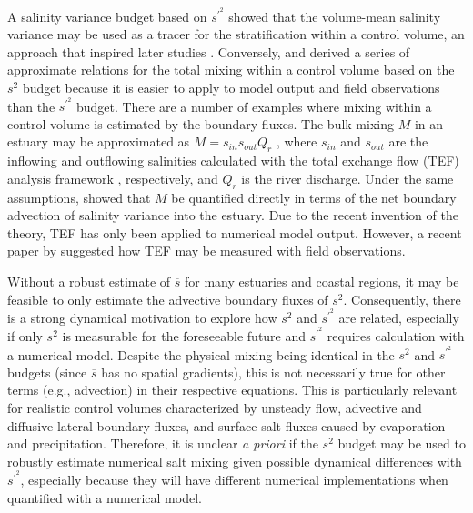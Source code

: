 \documentclass[draft]{agujournal2019}
\begin{document}
A salinity variance budget based on $s^{\prime^2}$ \cite{Li_2018} showed that the volume-mean salinity variance may be used as a tracer for the stratification within a control volume, an approach that inspired later studies \cite{Broatch_2022, Li_2021, Wang_2018}. Conversely,  and  derived a series of approximate relations for the total mixing within a control volume based on the $s^2$ budget because it is easier to apply to model output and field observations than the $s^{\prime^2}$ budget. There are a number of examples where mixing within a control volume is estimated by the boundary fluxes. The bulk mixing $M$ in an estuary may be approximated as $M=s_{in}s_{out}Q_r$ \cite{Burchard_2019, Burchard_2020}, where $s_{in}$ and $s_{out}$ are the inflowing and outflowing salinities calculated with the total exchange flow (TEF) analysis framework \cite{MacCready_2011}, respectively, and $Q_r$ is the river discharge. Under the same assumptions,  showed that $M$ be quantified directly in terms of the net boundary advection of salinity variance into the estuary. Due to the recent invention of the theory, TEF has only been applied to numerical model output. However, a recent paper by  suggested how TEF may be measured with field observations. 

Without a robust estimate of $\overline{s}$ for many estuaries and coastal regions, it may be feasible to only estimate the advective boundary fluxes of $s^2$. Consequently, there is a strong dynamical motivation to explore how $s^2$ and $s^{\prime^2}$ are related, especially if only $s^2$ is measurable for the foreseeable future and $s^{\prime^2}$ requires calculation with a numerical model. Despite the physical mixing being identical in the $s^2$ and $s^{\prime^2}$ budgets (since $\overline{s}$ has no spatial gradients), this is not necessarily true for other terms (e.g., advection) in their respective equations. This is particularly relevant for realistic control volumes characterized by unsteady flow, advective and diffusive lateral boundary fluxes, and surface salt fluxes caused by evaporation and precipitation. Therefore, it is unclear \textit{a priori} if the $s^2$ budget may be used to robustly estimate numerical salt mixing given possible dynamical differences with $s^{\prime^2}$, especially because they will have different numerical implementations when quantified with a numerical model.
\end{document}
